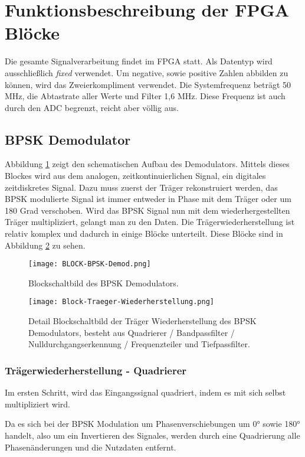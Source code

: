 \section{Funktionsbeschreibung der FPGA Blöcke}
Die gesamte Signalverarbeitung findet im FPGA statt. Als Datentyp wird ausschließlich \emph{fixed} verwendet. Um negative, sowie positive Zahlen abbilden zu können, wird das Zweierkompliment verwendet. Die Systemfrequenz beträgt 50 MHz, die Abtastrate aller Werte und Filter 1,6 MHz. Diese Frequenz ist auch durch den ADC begrenzt, reicht aber völlig aus.

\subsection{BPSK Demodulator}
Abbildung \ref{fig:BlockDemod} zeigt den schematischen Aufbau des Demodulators. Mittels dieses Blockes wird aus dem analogen, zeitkontinuierlichen Signal, ein digitales zeitdiskretes Signal. Dazu muss zuerst der Träger rekonstruiert werden, das BPSK modulierte Signal ist immer entweder in Phase mit dem Träger oder um 180 Grad verschoben. Wird das BPSK Signal nun mit dem wiederhergestellten Träger multipliziert, gelangt man zu den Daten. Die Trägerwiederherstellung ist relativ komplex und dadurch in einige Blöcke unterteilt. Diese Blöcke sind in Abbildung \ref{fig:BlockCarrierRecovery} zu sehen.

\begin{figure}[H]
\centering
\texttt{[image: BLOCK-BPSK-Demod.png]}
\caption{Blockschaltbild des BPSK Demodulators.}
\label{fig:BlockDemod}
\end{figure}

\begin{figure}[H]
\centering
\texttt{[image: Block-Traeger-Wiederherstellung.png]}
\caption{Detail Blockschaltbild der Träger Wiederherstellung des BPSK Demodulators, besteht aus Quadrierer / Bandpassfilter / Nulldurchgangserkennung / Frequenzteiler und Tiefpassfilter.}
\label{fig:BlockCarrierRecovery}
\end{figure}

\subsubsection*{Trägerwiederherstellung - Quadrierer}
Im ersten Schritt, wird das Eingangssignal quadriert, indem es mit sich selbst multipliziert wird. 

Da es sich bei der BPSK Modulation um Phasenverschiebungen um 0° sowie 180° handelt, also um ein Invertieren des Signales, werden durch eine Quadrierung alle Phasenänderungen und die Nutzdaten entfernt.  

